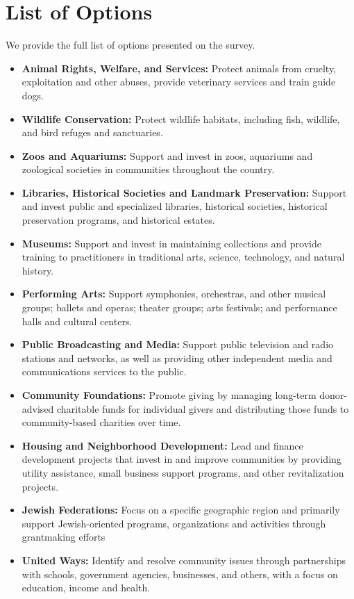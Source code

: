 \section{List of Options}
\label{sec:charityList}
We provide the full list of options presented on the survey.

\begin{itemize}
    \item \textbf{Animal Rights, Welfare, and Services:} Protect animals from cruelty, exploitation and other abuses, provide veterinary services and train guide dogs.
    \item \textbf{Wildlife Conservation:} Protect wildlife habitats, including fish, wildlife, and bird refuges and sanctuaries.
    \item \textbf{Zoos and Aquariums:} Support and invest in zoos, aquariums and zoological societies in communities throughout the country.
    \item \textbf{Libraries, Historical Societies and Landmark Preservation:} Support and invest public and specialized libraries, historical societies, historical preservation programs, and historical estates.
    \item \textbf{Museums:} Support and invest in maintaining collections and provide training to practitioners in traditional arts, science, technology, and natural history.
    \item \textbf{Performing Arts:} Support symphonies, orchestras, and other musical groups; ballets and operas; theater groups; arts festivals; and performance halls and cultural centers.
    \item \textbf{Public Broadcasting and Media:} Support public television and radio stations and networks, as well as providing other independent media and communications services to the public.
    \item \textbf{Community Foundations:} Promote giving by managing long-term donor-advised charitable funds for individual givers and distributing those funds to community-based charities over time.
    \item \textbf{Housing and Neighborhood Development:} Lead and finance development projects that invest in and improve communities by providing utility assistance, small business support programs, and other revitalization projects.
    \item \textbf{Jewish Federations:} Focus on a specific geographic region and primarily support Jewish-oriented programs, organizations and activities through grantmaking efforts
    \item \textbf{United Ways:} Identify and resolve community issues through partnerships with schools, government agencies, businesses, and others, with a focus on education, income and health.

\end{itemize}

